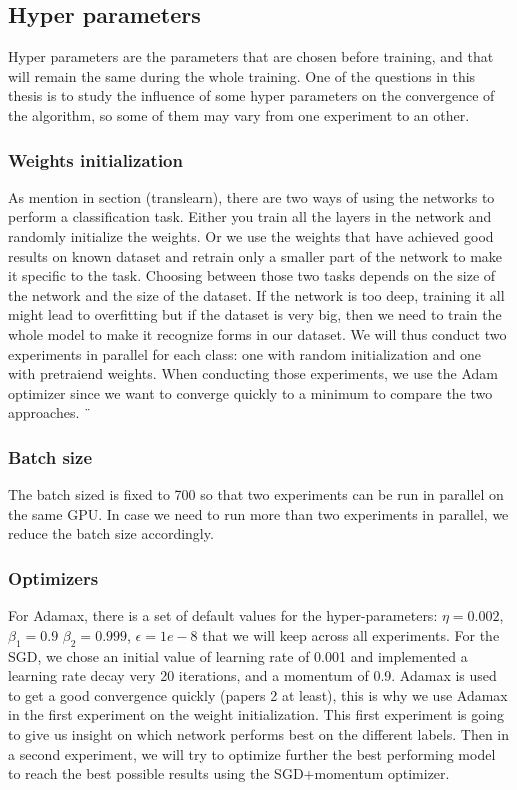 \subsection{Hyper parameters}
Hyper parameters are the parameters that are chosen before training, and that will remain the same during the whole training. One of the questions in this thesis is to study the influence of some hyper parameters on the  convergence of the algorithm, so some of them may vary from one experiment to an other. 

\subsubsection{Weights initialization}
As mention in section (translearn), there are two ways of using the networks to perform a classification task. Either you train all the layers in the network and randomly initialize the weights. Or we use the weights that have achieved good results on known dataset and retrain only a smaller part of the network to make it specific to the task.
Choosing between those two tasks depends on the size of the network and the size of the dataset. If the network is too deep, training it all might lead to overfitting but if the dataset is very big, then we need to train the whole model to make it recognize forms in our dataset. 
We will thus conduct two experiments in parallel for each class: one with random initialization and one with pretraiend weights. 
When conducting those experiments, we use the Adam optimizer since we want to converge quickly to a minimum to compare the two approaches. ¨

\subsubsection{Batch size}
The batch sized is fixed to 700 so that two experiments can be run in parallel on the same GPU. In case we need to run more than two experiments in parallel, we reduce the batch size accordingly.

\subsubsection{Optimizers}
For Adamax, there is a set of default values for the hyper-parameters: \(\eta = 0.002\), \(\beta_1 = 0.9\) \(\beta_2 = 0.999\), \(\epsilon = 1e-8\) that we will keep across all experiments.
For the SGD, we chose an initial value of learning rate of 0.001 and implemented a learning rate decay very 20 iterations, and a momentum of 0.9. 
Adamax is used to get a good convergence quickly (papers 2 at least), this is why we use Adamax in the first experiment on the weight initialization. This first experiment is going to give us insight on which network performs best on the different labels. Then in a second experiment, we will try to optimize further the best performing model to reach the best possible results using the SGD+momentum optimizer.  

